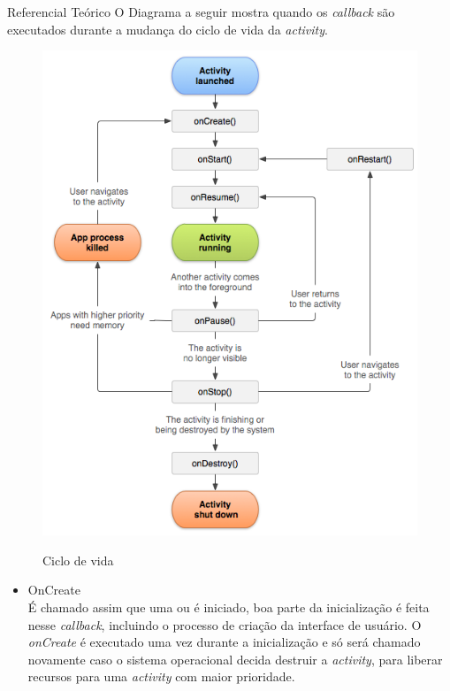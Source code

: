 \documentclass[
	12pt,				%
	openany,			%
	twoside,			%
	a4paper,			%
	english,			%
	french,				%
	spanish,			%
	brazil				%
	]{abntex2}
\begin{document}
\begin{chapter}{Referencial Teórico}
O Diagrama a seguir mostra quando os \textit{callback} são executados durante a mudança do ciclo de vida da \textit{activity}.
\begin{figure}[h]
\centering
   \caption{Ciclo de vida}
   \includegraphics[scale=0.70]{media/activity_lifecycle.png}
     \label{fig:lifecycle}
\end{figure}

\newpage
\begin{itemize}
\item{OnCreate} \\
     É chamado assim que uma  ou  é iniciado, boa parte da inicialização é feita nesse \textit{callback}, incluindo o processo de criação da interface de usuário. O \textit{onCreate} é executado uma vez durante a inicialização e só será chamado novamente caso o sistema operacional decida destruir a \textit{activity}, para liberar recursos para uma \textit{activity} com maior prioridade.
     

\end{itemize}
\end{chapter}
\end{document}
